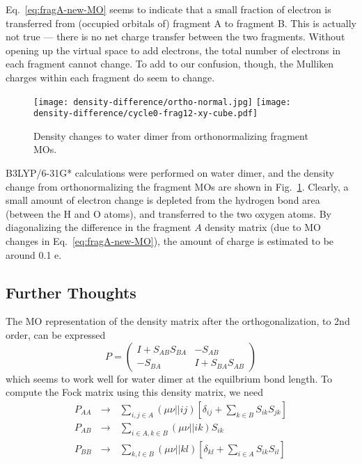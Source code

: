\documentclass[aip,jcp,preprint,superscriptaddress,amsmath,amssymb]{revtex4-1}
\begin{document}
Eq.~\ref{eq:fragA-new-MO} seems to indicate that a small fraction of electron is transferred 
from (occupied orbitals of) fragment A to fragment B.   
This is actually not true --- there is no net charge transfer between the two fragments.   
 Without opening up the virtual space to add electrons, the total number of electrons in each fragment cannot change. 
To add to our confusion, though, the Mulliken charges within each fragment do seem to change.   

\begin{figure}[htp]
\caption{Density changes to water dimer from orthonormalizing fragment MOs. }
\label{fig:ortho-normal}
\texttt{[image: density-difference/ortho-normal.jpg]}
\texttt{[image: density-difference/cycle0-frag12-xy-cube.pdf]}
\end{figure}

B3LYP/6-31G* calculations were performed on water dimer, 
and the density change from orthonormalizing the fragment MOs are shown in Fig.~\ref{fig:ortho-normal}. 
Clearly, a small amount of electron change is depleted from the hydrogen bond area 
(between the H and O atoms), and transferred to the two oxygen atoms.  
By diagonalizing the difference in the fragment $A$ density matrix 
(due to MO changes in Eq.~\ref{eq:fragA-new-MO}), 
the amount of charge is estimated to be around 0.1 e. 

\subsection{Further Thoughts}

The MO representation of the density matrix after the orthogonalization, to 2nd order, can be expressed 
\begin{equation}
P = \begin{pmatrix} I + S_{AB}S_{BA} & -S_{AB} \\ 
- S_{BA} & I + S_{BA} S_{AB} \end{pmatrix}
\end{equation} 
which seems to work well for water dimer at the equilbrium bond length.
To compute the Fock matrix using this density matrix, we need 
\begin{eqnarray}
P_{AA} ~~~ \longrightarrow ~~~ \sum_{i,j \in A} (\mu \nu || ij )  \left[ \delta_{ij}  + \sum_{k \in B} S_{ik} S_{jk} \right] \\
P_{AB} ~~~ \longrightarrow ~~~ \sum_{i \in A, k \in B} ( \mu \nu || i k ) S_{ik}   \\
P_{BB} ~~~ \longrightarrow ~~~ \sum_{k,l \in B} ( \mu \nu || k l ) \left[ \delta_{kl} + \sum_{i \in A} S_{ik} S_{il} \right]  
\end{eqnarray}






%
\end{document}
